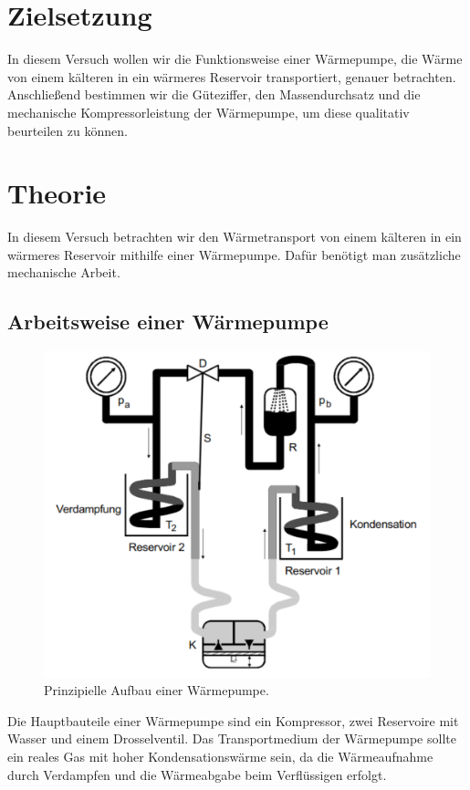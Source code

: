 \section{Zielsetzung}
\label{sec:Zielsetzung}
In diesem Versuch wollen wir die Funktionsweise einer Wärmepumpe, die Wärme von einem kälteren in ein wärmeres Reservoir transportiert, genauer betrachten.
Anschließend bestimmen wir die Güteziffer, den Massendurchsatz und die mechanische Kompressorleistung der Wärmepumpe, um diese qualitativ beurteilen zu können.  
\section{Theorie}
\label{sec:Theorie}
In diesem Versuch betrachten wir den Wärmetransport von einem kälteren in ein wärmeres Reservoir mithilfe einer Wärmepumpe.
Dafür benötigt man zusätzliche mechanische Arbeit.

\subsection{Arbeitsweise einer Wärmepumpe}
\begin{figure}
    \centering
    \includegraphics[width=\textwidth]{Aufbau_Waermepumpe.pdf}
    \caption{Prinzipielle Aufbau einer Wärmepumpe.\cite{sample} }
\end{figure}
Die Hauptbauteile einer Wärmepumpe sind ein Kompressor, zwei Reservoire mit Wasser und einem Drosselventil.
Das Transportmedium der Wärmepumpe sollte ein reales Gas mit hoher Kondensationswärme sein, da die Wärmeaufnahme  durch Verdampfen und die Wärmeabgabe beim Verflüssigen erfolgt.

